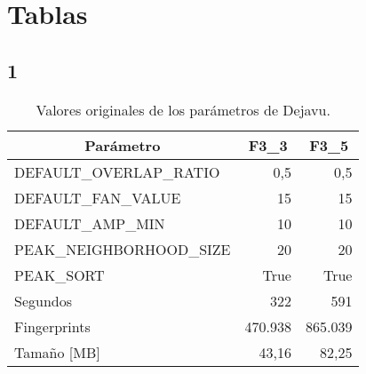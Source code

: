 
\chapter{Tablas}

\section{1}


\FloatBarrier
\begin{table}[]
\centering
\caption{Valores originales de los parámetros de Dejavu.}
\label{tab:ConfiguracionBDDF35}
\begin{tabular}{@{}lrr@{}}
\toprule
\midrule
\multicolumn{1}{c}{Parámetro} & \multicolumn{1}{c}{F3\_3} & \multicolumn{1}{c}{F3\_5} \\ \midrule
DEFAULT\_OVERLAP\_RATIO   & 0,5                       & 0,5                       \\
DEFAULT\_FAN\_VALUE       & 15                        & 15                        \\
DEFAULT\_AMP\_MIN         & 10                        & 10                        \\
PEAK\_NEIGHBORHOOD\_SIZE  & 20                        & 20                        \\
PEAK\_SORT                & True                      & True                      \\
\midrule
Segundos                  & 322                       & 591                       \\
Fingerprints              & 470.938                   & 865.039                   \\
Tamaño {[}MB{]}           & 43,16                     & 82,25                     \\ \midrule \bottomrule
\end{tabular}
\end{table}


